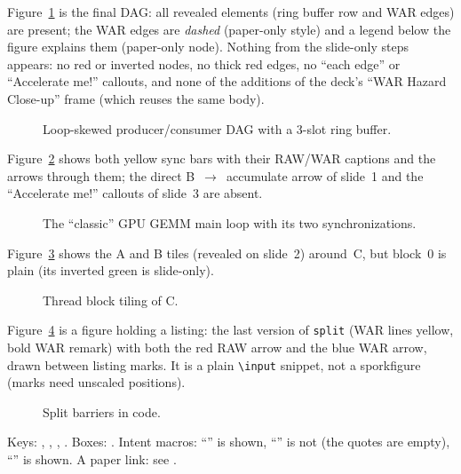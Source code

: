 \documentclass{article}
\begin{document}

Figure~\ref{fig:dag} is the final DAG: all revealed elements (ring buffer row and WAR edges)
are present; the WAR edges are \emph{dashed} (paper-only style) and a legend below the
figure explains them (paper-only node). Nothing from the slide-only steps appears:
no red or inverted nodes, no thick red edges, no ``each edge'' or ``Accelerate me!'' callouts,
and none of the additions of the deck's ``WAR Hazard Close-up'' frame (which reuses the same body).

\begin{figure}[ht]
\centering
\begin{sporkfigure}

\end{sporkfigure}
\caption{Loop-skewed producer/consumer DAG with a 3-slot ring buffer.}
\label{fig:dag}
\end{figure}

Figure~\ref{fig:sync_flow} shows both yellow sync bars with their RAW/WAR captions
and the arrows through them; the direct B~$\to$~accumulate arrow of slide~1
and the ``Accelerate me!'' callouts of slide~3 are absent.

\begin{figure}[ht]
\centering
\begin{sporkfigure}

\end{sporkfigure}
\caption{The ``classic'' GPU GEMM main loop with its two synchronizations.}
\label{fig:sync_flow}
\end{figure}

Figure~\ref{fig:grid_tile} shows the A and B tiles (revealed on slide~2) around~C,
but block~0 is plain (its inverted green is slide-only).

\begin{figure}[ht]
\centering
\begin{sporkfigure}

\end{sporkfigure}
\caption{Thread block tiling of C.}
\label{fig:grid_tile}
\end{figure}

Figure~\ref{fig:split_marks} is a figure holding a listing: the last version of \texttt{split}
(WAR lines yellow, bold WAR remark) with both the red RAW arrow and the blue WAR arrow,
drawn between listing marks. It is a plain \texttt{\textbackslash input} snippet, not a sporkfigure
(marks need unscaled positions).

\begin{figure}[ht]
\centering

\caption{Split barriers in code.}
\label{fig:split_marks}
\end{figure}


Keys: , , , .
Boxes:     
. Intent macros: ``'' is shown,
``'' is not (the quotes are empty),
``'' is shown. A paper link: see .
\end{document}
